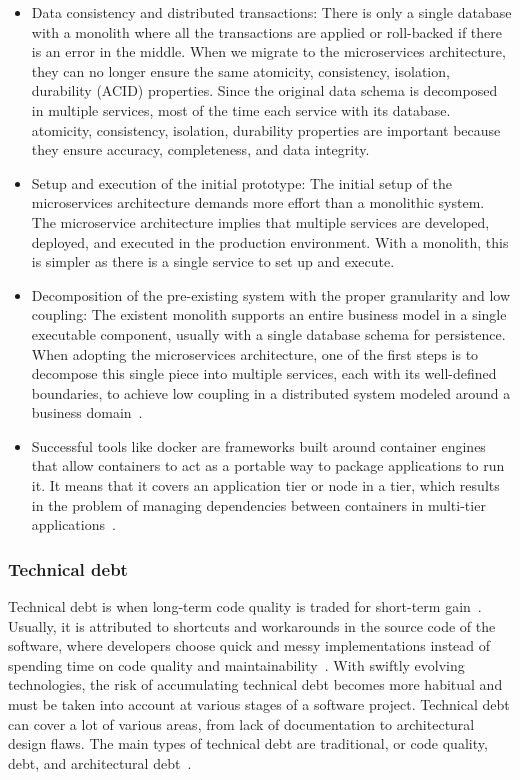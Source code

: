 \begin{itemize}
	\item Data consistency and distributed transactions:
There is only a single database with a monolith where all the transactions are applied or roll-backed if there is an error in the middle. When we migrate to the microservices architecture, they can no longer ensure the same atomicity, consistency, isolation, durability (ACID)  properties.  Since the original data schema is decomposed in multiple services, most of the time each service with its database. atomicity, consistency, isolation, durability  properties are important because they ensure accuracy, completeness, and data integrity.
	\item Setup and execution of the initial prototype:
The initial setup of the microservices architecture demands more effort than a monolithic system. The microservice architecture implies that multiple services are developed, deployed, and executed in the production environment. With a monolith, this is simpler as there is a single service to set up and execute.
	\item  Decomposition of the pre-existing system with the proper granularity and low coupling: 
The existent monolith supports an entire business model in a single executable component, usually with a single database schema for persistence. When adopting the microservices architecture, one of the first steps is to decompose this single piece into multiple services, each with its well-defined boundaries, to achieve low coupling in a distributed system modeled around a business domain~\cite{neves2019, Falatiuk2019}.
	\item Successful tools like docker are frameworks built around container engines that allow containers to act as a portable way to package applications to run it. It means that it covers  an  application tier or node in a tier, which results in the problem of managing dependencies between containers in multi-tier applications~\cite{Sharaf2019}.
\end{itemize}


\subsubsection{Technical debt}%

Technical debt is when long-term code quality is traded for short-term gain~\cite{Zrzavy2020}. Usually, it is attributed to shortcuts and workarounds in the source code of the software, where developers choose quick and messy implementations instead of spending time on code quality and maintainability~\cite{Tuuli2020}. With swiftly evolving technologies, the risk of accumulating technical debt becomes more habitual and must be taken into account at various stages of a software project. Technical debt can cover a lot of various areas, from lack of documentation to architectural design flaws. The main types of technical debt are traditional, or code quality, debt, and architectural debt~\cite{Handel2020, Uber}.


